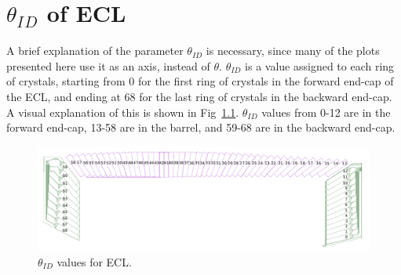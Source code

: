 \chapter{$\theta_{I}$$_{D}$ of ECL}
\label{chap:THID}


A brief explanation of the parameter $\theta_{ID}$ is necessary, since many of the plots presented here use it as an axis, instead of $\theta$. $\theta_{ID}$ is a value assigned to each ring of crystals, starting from 0 for the first ring of crystals in the forward end-cap of the ECL, and ending at 68 for the last ring of crystals in the backward end-cap. A visual explanation of this is shown in Fig~\ref{fig:thetaID}. $\theta_{ID}$ values from 0-12 are in the forward end-cap, 13-58 are in the barrel, and 59-68 are in the backward end-cap. 

\begin{figure}[htb]
	\centerfloat
		\includegraphics[scale=0.7]{images/ThetaID}
	\caption[$\theta_{ID}$ values for ECL]{$\theta_{ID}$ values for ECL.}	
	\label{fig:thetaID}
\end{figure}

